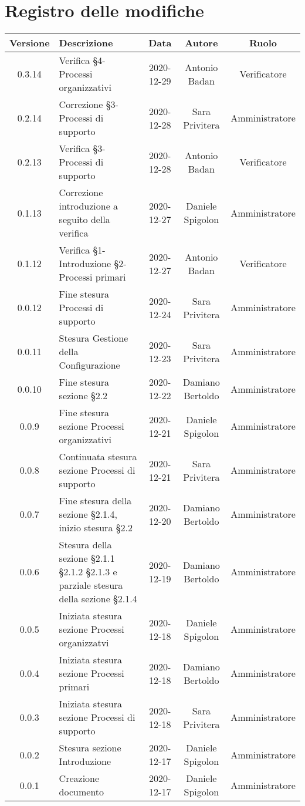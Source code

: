 \section*{Registro delle modifiche}

\begin{center}
	\begin{longtable}{|c|p{5cm}|c|c|c|}
	\hline
	\rowcolor{lighter-grayer}
	\textbf{Versione} & \textbf{Descrizione} & \textbf{Data} & \textbf{Autore} & \textbf{Ruolo} \\
	\hline
	\endfirsthead

	0.3.14 & Verifica §4-Processi organizzativi  & 2020-12-29 & Antonio Badan & Verificatore \\
	\hline
	0.2.14 & Correzione §3-Processi di supporto  & 2020-12-28 & Sara Privitera & Amministratore \\
	\hline
	0.2.13 & Verifica §3-Processi di supporto  & 2020-12-28 & Antonio Badan & Verificatore \\
	\hline
	0.1.13 & Correzione introduzione a seguito della verifica  & 2020-12-27 & Daniele Spigolon & Amministratore \\
	\hline
	0.1.12 & Verifica §1-Introduzione §2-Processi primari  & 2020-12-27 & Antonio Badan & Verificatore \\
	\hline
	0.0.12 & Fine stesura Processi di supporto & 2020-12-24 & Sara Privitera & Amministratore \\
	\hline
	0.0.11 & Stesura Gestione della Configurazione & 2020-12-23 & Sara Privitera & Amministratore \\
	\hline
	0.0.10 & Fine stesura sezione §2.2 & 2020-12-22 & Damiano Bertoldo & Amministratore \\
	\hline
	0.0.9 & Fine stesura sezione Processi organizzativi & 2020-12-21 & Daniele Spigolon & Amministratore \\
	\hline
	0.0.8 & Continuata stesura sezione Processi di supporto & 2020-12-21 & Sara Privitera & Amministratore \\
	\hline
	0.0.7 & Fine stesura della sezione §2.1.4, inizio stesura §2.2 & 2020-12-20 & Damiano Bertoldo & Amministratore \\
	\hline
	0.0.6 & Stesura della sezione §2.1.1 §2.1.2 §2.1.3 e parziale stesura della sezione §2.1.4 & 2020-12-19 & Damiano Bertoldo & Amministratore \\
	\hline
	0.0.5 & Iniziata stesura sezione Processi organizzatvi & 2020-12-18 & Daniele Spigolon & Amministratore \\
	\hline
	0.0.4 & Iniziata stesura sezione Processi primari & 2020-12-18 & Damiano Bertoldo & Amministratore \\
	\hline
	0.0.3 & Iniziata stesura sezione Processi di supporto & 2020-12-18 & Sara Privitera & Amministratore \\
	\hline
	0.0.2 & Stesura sezione Introduzione & 2020-12-17 & Daniele Spigolon & Amministratore \\
	\hline
	0.0.1 & Creazione documento & 2020-12-17 & Daniele Spigolon & Amministratore \\
	\hline
	
	

	\end{longtable}
\end{center}
